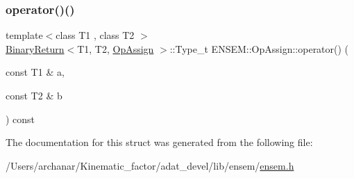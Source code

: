 \mbox{\label{structENSEM_1_1OpAssign_aaab39b3bd0c80dac6b56a48970ff388a}} 
\subsubsection{\texorpdfstring{operator()()}{operator()()}\hspace{0.1cm}{\footnotesize\ttfamily [2/2]}}
{\footnotesize\ttfamily template$<$class T1 , class T2 $>$ \\
\mbox{\hyperlink{structENSEM_1_1BinaryReturn}{Binary\+Return}}$<$T1, T2, \mbox{\hyperlink{structENSEM_1_1OpAssign}{Op\+Assign}} $>$\+::Type\+\_\+t E\+N\+S\+E\+M\+::\+Op\+Assign\+::operator() (\begin{DoxyParamCaption}\item[{const T1 \&}]{a,  }\item[{const T2 \&}]{b }\end{DoxyParamCaption}) const\hspace{0.3cm}{\ttfamily [inline]}}



The documentation for this struct was generated from the following file\+:\begin{DoxyCompactItemize}
\item 
/\+Users/archanar/\+Kinematic\+\_\+factor/adat\+\_\+devel/lib/ensem/\mbox{\hyperlink{lib_2ensem_2ensem_8h}{ensem.\+h}}\end{DoxyCompactItemize}
